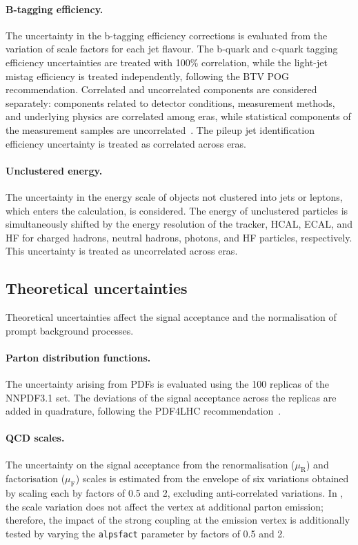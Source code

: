\paragraph{B-tagging efficiency.}
The uncertainty in the b-tagging efficiency corrections is evaluated from the variation of scale factors for each jet flavour. The b-quark and c-quark tagging efficiency uncertainties are treated with 100\% correlation, while the light-jet mistag efficiency is treated independently, following the BTV POG recommendation. Correlated and uncorrelated components are considered separately: components related to detector conditions, measurement methods, and underlying physics are correlated among eras, while statistical components of the measurement samples are uncorrelated~\cite{BTagSyst}. The pileup jet identification efficiency uncertainty is treated as correlated across eras.

\paragraph{Unclustered energy.}
The uncertainty in the energy scale of objects not clustered into jets or leptons, which enters the \ptmiss calculation, is considered. The energy of unclustered particles is simultaneously shifted by the energy resolution of the tracker, HCAL, ECAL, and HF for charged hadrons, neutral hadrons, photons, and HF particles, respectively. This uncertainty is treated as uncorrelated across eras.

\subsection{Theoretical uncertainties}
\label{ssec:syst_theoretical}

Theoretical uncertainties affect the signal acceptance and the normalisation of prompt background processes.

\paragraph{Parton distribution functions.}
The uncertainty arising from PDFs is evaluated using the 100 replicas of the NNPDF3.1 set. The deviations of the signal acceptance across the replicas are added in quadrature, following the PDF4LHC recommendation~\cite{PDF4LHC}.

\paragraph{QCD scales.}
The uncertainty on the signal acceptance from the renormalisation ($\mu_{\mathrm{R}}$) and factorisation ($\mu_{\mathrm{F}}$) scales is estimated from the envelope of six variations obtained by scaling each by factors of 0.5 and 2, excluding anti-correlated variations. In \MGvATNLO, the scale variation does not affect the vertex at additional parton emission; therefore, the impact of the strong coupling at the emission vertex is additionally tested by varying the \texttt{alpsfact} parameter by factors of 0.5 and 2.

